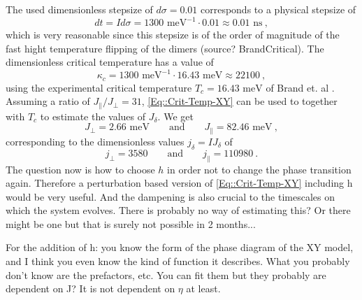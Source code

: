 	The used dimensionless stepsize of $d\sigma = 0.01$ corresponds to a physical stepsize of
	\begin{equation}
		dt = I d \sigma =	1300 \text{ meV}^{-1} \cdot 0.01 \approx 0.01 \text{ ns}~,
	\end{equation}
	which is very reasonable since this stepsize is of the order of magnitude of the fast hight temperature flipping of the dimers (source? BrandCritical). The dimensionless critical temperature has a value of
	\begin{equation}
		\kappa_c =	1300 \text{ meV}^{-1} \cdot 16.43 \text{ meV} \approx 22100~,
	\end{equation}
	using the experimental critical temperature $T_c =	16.43 \text{ meV}$ of Brand et. al \cite{brand2023dimer}.
	Assuming a ratio of $J_\parallel /	J_\perp =	31$, \autoref{Eq::Crit-Temp-XY} can be used to together with $T_c$ to estimate the values of $J_\delta$. We get
	\begin{equation}
		J_\perp =	2.66 \text{ meV} \qquad \text{and} \qquad J_\parallel = 82.46 \text{ meV}~,
	\end{equation}
	corresponding to the dimensionless values $j_\delta =	I J_\delta$ of
	\begin{equation}
		j_\perp =	3580 \qquad \text{and} \qquad j_\parallel =	110980~.
	\end{equation}
	The question now is how to choose $h$ in order not to change the phase transition again. Therefore a perturbation based version of \autoref{Eq::Crit-Temp-XY} including h would be very useful. And the dampening is also crucial to the timescales on which the system evolves. There is probably no way of estimating this? Or there might be one but that is surely not possible in 2 months...
	
	For the addition of h: you know the form of the phase diagram of the XY model, and I think you even know the kind of function it describes. What you probably don't know are the prefactors, etc. You can fit them but they probably are dependent on J? It is not dependent on $\eta$ at least. \\
	
